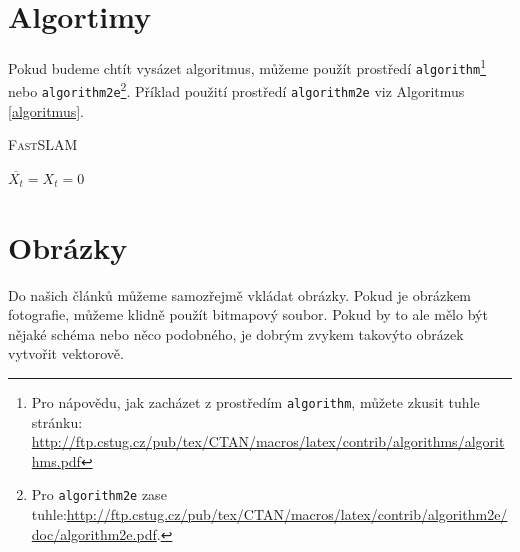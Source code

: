 \documentclass[a4paper, 11pt]{article}
\begin{document}
\newpage
\section{Algortimy}\label{sec:3}
Pokud budeme chtít vysázet algoritmus, můžeme použít prostředí \texttt{algorithm}\footnote{Pro nápovědu, jak zacházet z prostředím \texttt{algorithm}, můžete zkusit tuhle stránku:\\
\href{http://ftp.cstug.cz/pub/tex/CTAN/macros/latex/contrib/algorithms/algorithms.pdf}{http://ftp.cstug.cz/pub/tex/CTAN/macros/latex/contrib/algorithms/algorithms.pdf}} nebo \texttt{algorithm2e}\footnote{Pro \texttt{algorithm2e} zase tuhle:\href{http://ftp.cstug.cz/pub/tex/CTAN/macros/latex/contrib/algorithm2e/doc/algorithm2e.pdf.}{http://ftp.cstug.cz/pub/tex/CTAN/macros/latex/contrib/algorithm2e/doc/algorithm2e.pdf}.}. Příklad použití prostředí \texttt{algorithm2e} viz Algoritmus \ref{algoritmus}.

\begin{algorithm} \label{algoritmus}
    \SetNlSty{}{}{:}
    \caption{\textsc{FastSLAM}}
    
    $\overline{X_t} = X_t = 0$ \\
    \end{algorithm}

\section{Obrázky}
Do našich článků můžeme samozřejmě vkládat obrázky. Pokud je obrázkem fotografie,
můžeme klidně použít bitmapový soubor. Pokud by to ale mělo být nějaké schéma nebo
něco podobného, je dobrým zvykem takovýto obrázek vytvořit vektorově.
\end{document}
